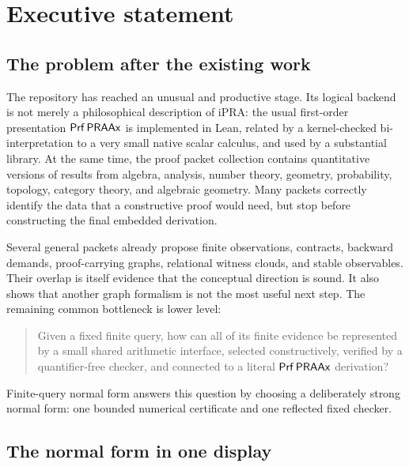 \section{Executive statement}

\subsection{The problem after the existing work}

The repository has reached an unusual and productive stage.  Its logical
backend is not merely a philosophical description of iPRA: the usual
first-order presentation \(\mathsf{Prf}\,\mathsf{PRAAx}\) is implemented in Lean, related by a
kernel-checked bi-interpretation to a very small native scalar calculus, and
used by a substantial  library.  At the same time, the proof
packet collection contains quantitative versions of results from algebra,
analysis, number theory, geometry, probability, topology, category theory, and
algebraic geometry.  Many packets correctly identify the data that a
constructive proof would need, but stop before constructing the final embedded
derivation.

Several general packets already propose finite observations, contracts,
backward demands, proof-carrying graphs, relational witness clouds, and stable
observables.  Their overlap is itself evidence that the conceptual direction is
sound.  It also shows that another graph formalism is not the most useful next
step.  The remaining common bottleneck is lower level:

\begin{quote}
Given a fixed finite query, how can all of its finite evidence be represented
by a small shared arithmetic interface, selected constructively, verified by a
quantifier-free checker, and connected to a literal \(\mathsf{Prf}\,\mathsf{PRAAx}\)
derivation?
\end{quote}

Finite-query normal form answers this question by choosing a deliberately
strong normal form: one bounded numerical certificate and one reflected fixed
checker.

\subsection{The normal form in one display}


